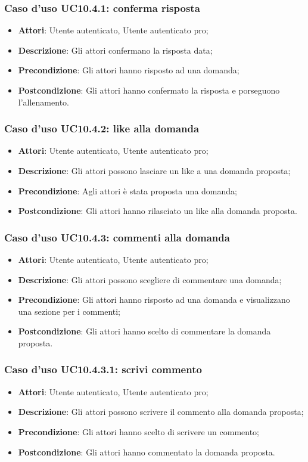 \subsubsection{Caso d'uso UC10.4.1: conferma risposta}
	\begin{itemize}
		\item \textbf{Attori}: Utente autenticato, Utente autenticato pro;
		\item \textbf{Descrizione}: Gli attori confermano la risposta data;
		\item \textbf{Precondizione}: Gli attori hanno risposto ad una domanda;
		\item \textbf{Postcondizione}: Gli attori hanno confermato la risposta e porseguono l'allenamento.
	\end{itemize}
\subsubsection{Caso d'uso UC10.4.2: like alla domanda}
	\begin{itemize}
		\item \textbf{Attori}: Utente autenticato, Utente autenticato pro;
		\item \textbf{Descrizione}: Gli attori possono lasciare un like a una domanda proposta;
		\item \textbf{Precondizione}: Agli attori è stata proposta una domanda;
		\item \textbf{Postcondizione}: Gli attori hanno rilasciato un like alla domanda proposta.
	\end{itemize}
\subsubsection{Caso d'uso UC10.4.3: commenti alla domanda}
	\begin{itemize}
		\item \textbf{Attori}: Utente autenticato, Utente autenticato pro;
		\item \textbf{Descrizione}: Gli attori possono scegliere di commentare una domanda;
		\item \textbf{Precondizione}: Gli attori hanno risposto ad una domanda e visualizzano una sezione per i commenti;
		\item \textbf{Postcondizione}: Gli attori hanno scelto di commentare la domanda proposta.
	\end{itemize}
\subsubsection{Caso d'uso UC10.4.3.1: scrivi commento}
	\begin{itemize}
		\item \textbf{Attori}: Utente autenticato, Utente autenticato pro;
		\item \textbf{Descrizione}: Gli attori possono scrivere il commento alla domanda proposta;
		\item \textbf{Precondizione}: Gli attori hanno scelto di scrivere un commento;
		\item \textbf{Postcondizione}: Gli attori hanno commentato la domanda proposta.
	\end{itemize}
